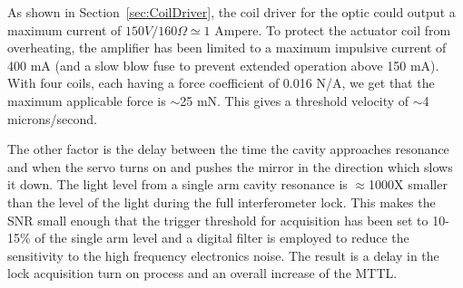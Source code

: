 As shown in Section~\ref{sec:CoilDriver}, the coil driver for the optic could output
a maximum current of $150 V / 160 \Omega \simeq 1$ Ampere. To protect the actuator coil
from overheating, the amplifier has been limited to a maximum impulsive current 
of 400 mA (and a slow blow fuse to prevent extended operation above 150 mA).
With four coils, each having a force coefficient of 0.016 N/A, we get that the
maximum applicable force is $\sim$25 mN. This gives a threshold velocity of
$\sim$4 microns/second.

The other factor is the delay between the time the cavity approaches resonance
and when the servo turns on and pushes the mirror in the direction which slows
it down. The light level from a single arm cavity resonance is $\approx$1000X
smaller than the level of the light during the full interferometer lock. This
makes the SNR small enough that the trigger threshold for acquisition has been
set to 10-15\% of the single arm level and a digital filter is employed to
reduce the sensitivity to the high frequency electronics noise. The result is 
a delay in the lock acquisition turn on process and an overall increase of the
MTTL.
 






